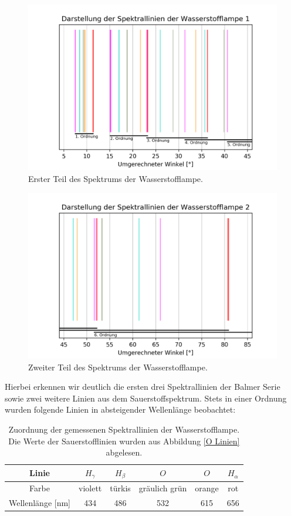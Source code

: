 \documentclass[]{article}
\begin{document}
\begin{figure}[H]
\centering
\includegraphics[width=1\textwidth]{Plots/HD_Linien_0.png}
\caption{ Erster Teil des Spektrums der Wasserstofflampe. }
\label{fig:H Lines 0}
\end{figure}

\begin{figure}[H]
\centering
\includegraphics[width=1\textwidth]{Plots/HD_Linien_1.png}
\caption{ Zweiter Teil des Spektrums der Wasserstofflampe.}
\label{fig:H Lines 1}
\end{figure}

Hierbei erkennen wir deutlich die ersten drei Spektrallinien der Balmer Serie sowie zwei weitere Linien aus dem Sauerstoffspektrum. Stets in einer Ordnung wurden folgende Linien in absteigender Wellenlänge beobachtet:

\begin{table}[H]
	\centering
	\begin{tabular}{c|c|c|c|c|c}
		Linie & $H_\gamma$ & $H_\beta$ & $O$ & $O$ & $H_\alpha$ \\
		\hline
		Farbe & violett & türkis & gräulich grün & orange & rot \\
		\hline
		Wellenlänge [nm]  & 434 & 486 & 532 & 615 & 656 \\
	\end{tabular}
	\caption{Zuordnung der gemessenen Spektrallinien der Wasserstofflampe. Die Werte der Sauerstofflinien wurden aus Abbildung \ref{O Linien} abgelesen. }
\end{table}
\end{document}
